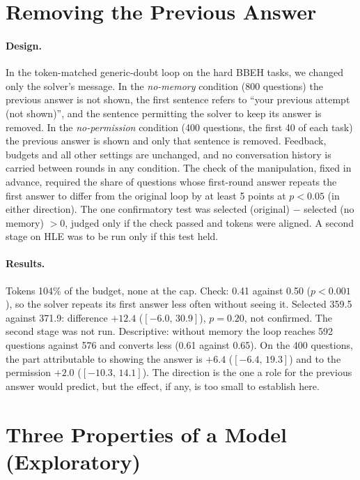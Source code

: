 \documentclass[11pt]{article}
\newcommand{\ci}[2]{$[#1,\,#2]$}
\begin{document}
\section{Removing the Previous Answer}
\label{app:memory}

\paragraph{Design.}
In the token-matched generic-doubt loop on the hard BBEH tasks, we changed only the solver's message.
In the \emph{no-memory} condition (800 questions) the previous answer is not shown, the first sentence refers to ``your previous attempt (not shown)'', and the sentence permitting the solver to keep its answer is removed. In the \emph{no-permission} condition (400 questions, the first 40 of each task) the previous answer is shown and only that sentence is removed.
Feedback, budgets and all other settings are unchanged, and no conversation history is carried between rounds in any condition.
The check of the manipulation, fixed in advance, required the share of questions whose first-round answer repeats the first answer to differ from the original loop by at least 5 points at $p<0.05$ (in either direction).
The one confirmatory test was selected (original) $-$ selected (no memory) $>0$, judged only if the check passed and tokens were aligned.
A second stage on HLE was to be run only if this test held.

\paragraph{Results.}
Tokens 104\% of the budget, none at the cap.
Check: 0.41 against 0.50 ($p<0.001$), so the solver repeats its first answer less often without seeing it.
Selected 359.5 against 371.9: difference $+12.4$ (\ci{-6.0}{30.9}), $p=0.20$, not confirmed. The second stage was not run.
Descriptive: without memory the loop reaches 592 questions against 576 and converts less (0.61 against 0.65). On the 400 questions, the part attributable to showing the answer is $+6.4$ (\ci{-6.4}{19.3}) and to the permission $+2.0$ (\ci{-10.3}{14.1}).
The direction is the one a role for the previous answer would predict, but the effect, if any, is too small to establish here.

\section{Three Properties of a Model (Exploratory)}
\label{app:props}
\end{document}
